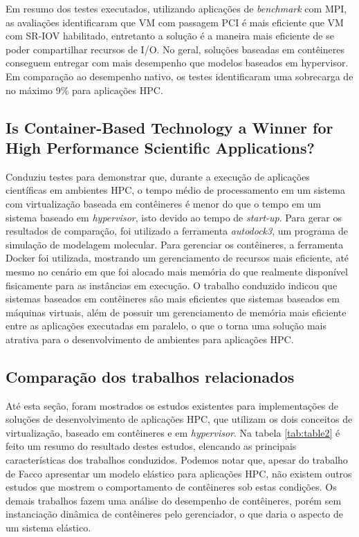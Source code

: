 \documentclass[twoside,english,brazilian]{UNISINOSartigo}
\begin{document}
\begin{itemize}
Em resumo dos testes executados, utilizando aplicações de \textit{benchmark} com MPI, as avaliações identificaram que VM com passagem PCI é mais eficiente que VM com SR-IOV habilitado, entretanto a solução é a maneira mais eficiente de se poder compartilhar recursos de I/O. No geral, soluções baseadas em contêineres conseguem entregar com mais desempenho que modelos baseados em hypervisor. Em comparação ao desempenho nativo, os testes identificaram uma sobrecarga de no máximo 9\% para aplicações HPC.

\subsection{Is Container-Based Technology a Winner for High Performance Scientific Applications?}
\label{trabdocker5}

 Conduziu testes para demonstrar que, durante a execução de aplicações científicas em ambientes HPC, o tempo médio de processamento em um sistema com virtualização baseada em contêineres é menor do que o tempo em um sistema baseado em \textit{hypervisor}, isto devido ao tempo de \textit{start-up}. Para gerar os resultados de comparação, foi utilizado a ferramenta \textit{autodock3}, um programa de simulação de modelagem molecular. Para gerenciar os contêineres, a ferramenta Docker foi utilizada, mostrando um gerenciamento de recursos mais eficiente, até mesmo no cenário em que foi alocado mais memória do que realmente disponível fisicamente para as instâncias em execução. 
O trabalho conduzido indicou que sistemas baseados em contêineres são mais eficientes que sistemas baseados em máquinas virtuais, além de possuir um gerenciamento de memória mais eficiente entre as aplicações executadas em paralelo, o que o torna uma solução mais atrativa para o desenvolvimento de ambientes para aplicações HPC.

\subsection{Comparação dos trabalhos relacionados}
\label{comparacao}
Até esta seção, foram mostrados os estudos existentes para implementações de soluções de desenvolvimento de aplicações HPC, que utilizam os dois conceitos de virtualização, baseado em contêineres e em \textit{hypervisor}. Na tabela \ref{tab:table2} é feito um resumo do resultado destes estudos, elencando as principais características dos trabalhos conduzidos. Podemos notar que, apesar do trabalho de Facco  apresentar um modelo elástico para aplicações HPC, não existem outros estudos que mostrem o comportamento de contêineres sob estas condições. Os demais trabalhos fazem uma análise do desempenho de contêineres, porém sem instanciação dinâmica de contêineres pelo gerenciador, o que daria o aspecto de um sistema elástico.


\end{itemize}
\end{document}
